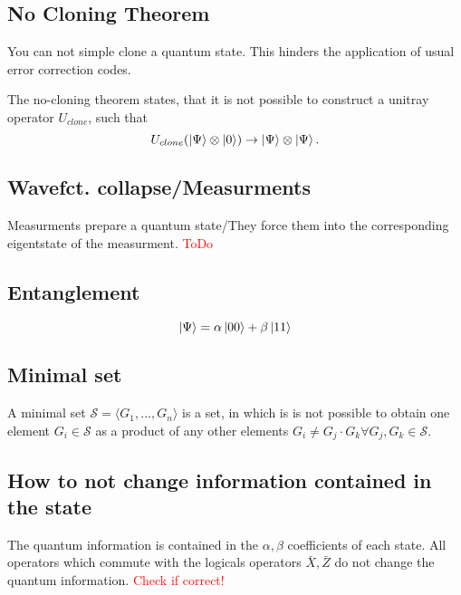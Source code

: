 \subsection{No Cloning Theorem}\label{sec:basic.math.no_cloning_theorem}
You can not simple clone a quantum state. 
This hinders the application of usual error correction codes.

The no-cloning theorem states, that it is not possible to construct a unitray operator $U_{clone}$, such that 
\begin{equation}
    U_{clone} (\ket{\Psi} \otimes \ket{0} ) \rightarrow \ket{\Psi} \otimes \ket{\Psi}.
\end{equation}
\cite{QECintro}


\subsection{Wavefct. collapse/Measurments}\label{sec:basic.math.wavefct_collpase}
Measurments prepare a quantum state/They force them into the corresponding eigentstate of the measurment.
\textcolor{red}{ToDo}


\subsection{Entanglement}
\begin{equation}
    \ket{\Psi} = \alpha \ket{00} + \beta \ket{11}
\end{equation}


\subsection{Minimal set}\label{sec:basic.math.minimal_set}

A minimal set $\mathcal{S}= \langle G_1,...,G_n\rangle$ is a set, 
in which is is not possible to obtain one element $G_i \in \mathcal{S}$ as a product of any other elements  $G_i \ne G_j \cdot G_k \forall G_j,G_k\in\mathcal{S}$.\cite{QECintro}


\subsection{How to not change information contained in the state}
The quantum information is contained in the $\alpha,\beta$ coefficients of each state.
All operators which commute with the logicals operators $\bar{X},\bar{Z}$ do not change the quantum information. \cite{QECmemory}
\textcolor{red}{Check if correct!}